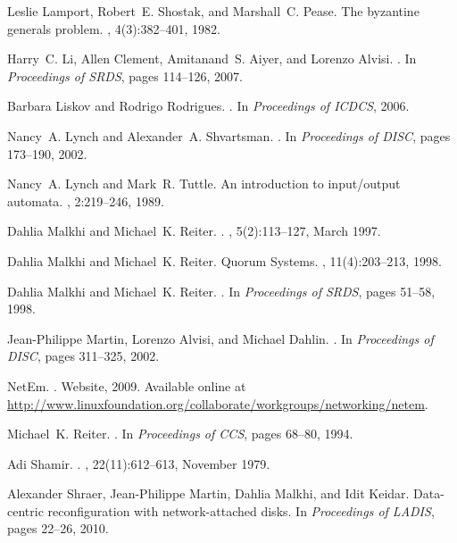 \documentclass[10pt,conference,compsocconf]{IEEEtran}
\begin{document}
\begin{thebibliography}{10}
Leslie Lamport, Robert~E. Shostak, and Marshall~C. Pease.
\newblock The byzantine generals problem.
, 4(3):382--401, 1982.

Harry~C. Li, Allen Clement, Amitanand~S. Aiyer, and Lorenzo Alvisi.
.
\newblock In {\em Proceedings of SRDS}, pages 114--126, 2007.

Barbara Liskov and Rodrigo Rodrigues.
.
\newblock In {\em Proceedings of ICDCS}, 2006.

Nancy~A. Lynch and Alexander~A. Shvartsman.
.
\newblock In {\em Proceedings of DISC}, pages 173--190, 2002.

Nancy~A. Lynch and Mark~R. Tuttle.
\newblock An introduction to input/output automata.
, 2:219--246, 1989.

Dahlia Malkhi and Michael~K. Reiter.
.
, 5(2):113--127, March 1997.

Dahlia Malkhi and Michael~K. Reiter.
 {Q}uorum {S}ystems.
, 11(4):203--213, 1998.

Dahlia Malkhi and Michael~K. Reiter.
.
\newblock In {\em Proceedings of SRDS}, pages 51--58, 1998.

Jean-Philippe Martin, Lorenzo Alvisi, and Michael Dahlin.
.
\newblock In {\em Proceedings of DISC}, pages 311--325, 2002.

NetEm.
.
\newblock Website, 2009.
\newblock Available online at
  \url{http://www.linuxfoundation.org/collaborate/workgroups/networking/netem}.

Michael~K. Reiter.
.
\newblock In {\em Proceedings of CCS}, pages 68--80, 1994.

Adi Shamir.
.
, 22(11):612--613, November 1979.

Alexander Shraer, Jean-Philippe Martin, Dahlia Malkhi, and Idit Keidar.
\newblock Data-centric reconfiguration with network-attached disks.
\newblock In {\em Proceedings of LADIS}, pages 22--26, 2010.


\end{thebibliography}
\end{document}
